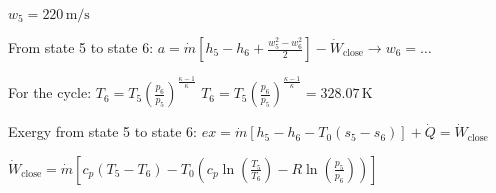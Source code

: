 \( w_5 = 220 \, \text{m/s} \)  

From state 5 to state 6:  
\( a = \dot{m} \left[ h_5 - h_6 + \frac{w_5^2 - w_6^2}{2} \right] - \dot{W}_{\text{close}} \rightarrow w_6 = \ldots \)  

For the cycle:  
\( T_6 = T_5 \left( \frac{p_6}{p_5} \right)^{\frac{\kappa - 1}{\kappa}} \)  
\( T_6 = T_5 \left( \frac{p_6}{p_5} \right)^{\frac{\kappa - 1}{\kappa}} = 328.07 \, \text{K} \)  

Exergy from state 5 to state 6:  
\( ex = \dot{m} \left[ h_5 - h_6 - T_0 (s_5 - s_6) \right] + \dot{Q} = \dot{W}_{\text{close}} \)  

\( \dot{W}_{\text{close}} = \dot{m} \left[ c_p (T_5 - T_6) - T_0 \left( c_p \ln \left( \frac{T_5}{T_6} \right) - R \ln \left( \frac{p_5}{p_6} \right) \right) \right] \)